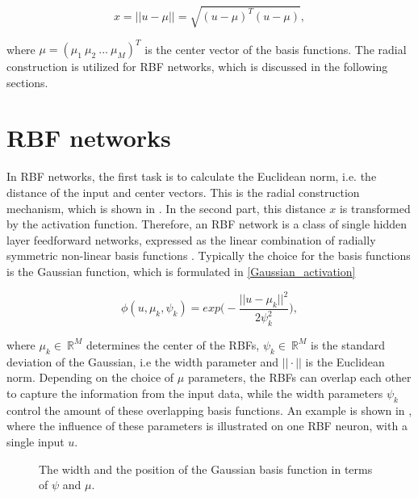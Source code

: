  \begin{equation}
\label{radial_structure}
x = ||u- \mu|| = \sqrt{(u-\mu)^T (u-\mu)},
\end{equation}

where $\mu = (\mu_1 \ \mu_2 \ ... \ \mu_M)^T$ is the center vector of the basis functions. The radial construction is utilized for RBF networks, which is discussed in the following sections.


\section{RBF networks}
\label{Radial_basis_function_networks}

 In RBF networks, the first task is to calculate the Euclidean norm, i.e. the distance of the input and center vectors. This is the radial construction mechanism, which is shown in . In the second part, this distance $x$ is transformed by the activation function. Therefore, an RBF network is a class of single hidden layer feedforward networks, expressed as the linear combination of radially symmetric non-linear basis functions \cite{RBF_article}. Typically the choice for the basis functions is the Gaussian function, which is formulated in \eqref{Gaussian_activation} 

\begin{equation}
\label{Gaussian_activation}
\phi(u,\mu_k, \psi_k) = exp \Big(-\frac{||u-\mu_k||^2}{2\psi_k^2}\Big), 
\end{equation}

where $\mu_k \in \: \mathbb{R}^{M}$ determines the center of the RBFs, $\psi_k \in \: \mathbb{R}^{M}$ is the standard deviation of the Gaussian, i.e the width parameter and $||\cdot||$ is the Euclidean norm. Depending on the choice of $\mu$ parameters, the RBFs can overlap each other to capture the information from the input data, while the width parameters $\psi_k$ control the amount of these overlapping basis functions. An example is shown in , where the influence of these parameters is illustrated on one RBF neuron, with a single input $u$. 

\begin{figure}[H]
\centering
 
\caption{The width and the position of the Gaussian basis function in terms of $\psi$ and $\mu$.}
\label{fig:rbf_pram}
\end{figure}

